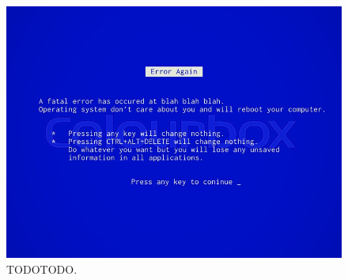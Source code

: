 \begin{figure}[H]
\centering
\includegraphics[scale=1.0,frame]{./Config/Findings_Database/DR_Template/ProperScreenshot}
\caption{TODOTODO.}
\label{figure:SuperDuperPictureLabel}
\end{figure}

